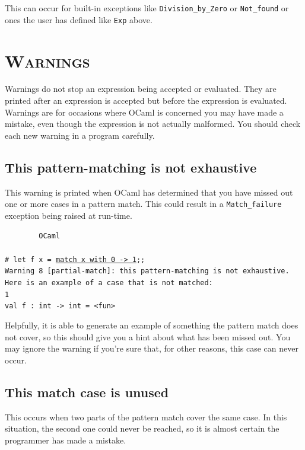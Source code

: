 \documentclass[]{book}
\newcommand{\smspace}{\vspace{4mm}}
\begin{document}
\noindent This can occur for built-in exceptions like \texttt{Division\_by\_Zero} or \texttt{Not\_found} or ones the user has defined like \texttt{Exp} above.

\section*{\scshape Warnings}

Warnings do not stop an expression being accepted or evaluated. They are printed after an expression is accepted but before the expression is evaluated. Warnings are for occasions where OCaml is concerned you may have made a mistake, even though the expression is not actually malformed. You should check each new warning in a program carefully.

\subsection*{This pattern-matching is not exhaustive}

This warning is printed when OCaml has determined that you have missed out one or more cases in a pattern match. This could result in a \texttt{Match\_failure} exception being raised at run-time.

\smspace
\noindent\verb!        OCaml!\\
\noindent\\
\texttt{\# let f x = \underline{match x with 0 -> 1};;}\\
\texttt{Warning 8 [partial-match]:\ this pattern-matching is not exhaustive.}\\
\texttt{Here is an example of a case that is not matched:}\\
\texttt{1}\\
\texttt{val f :\ int -> int = <fun>}
\smspace

\noindent Helpfully, it is able to generate an example of something the pattern match does not cover, so this should give you a hint about what has been missed out. You may ignore the warning if you're sure that, for other reasons, this case can never occur.

\subsection*{This match case is unused}

This occurs when two parts of the pattern match cover the same case. In this situation, the second one could never be reached, so it is almost certain the programmer has made a mistake.
\end{document}
